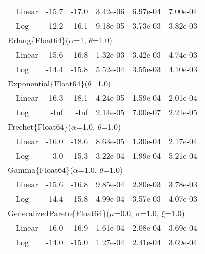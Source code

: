 \begin{tabular}{|llrrrrr|}
& Linear & {\color{blue}-15.7} & {\color{blue}-17.0} & {\color{blue}3.42e-06} & {\color{blue}6.97e-04} & {\color{blue}7.00e-04}\\
& Log & -12.2 & -16.1 & 9.18e-05 & 3.73e-03 & 3.82e-03\\
\hline
\multicolumn{7}{|l|}{Erlang\{Float64\}($\alpha$=1, $\theta$=1.0)}\\ \hline
& Linear & {\color{blue}-15.6} & {\color{blue}-16.8} & 1.32e-03 & {\color{blue}3.42e-03} & 4.74e-03\\
& Log & -14.4 & -15.8 & {\color{blue}5.52e-04} & 3.55e-03 & {\color{blue}4.10e-03}\\
\hline
\multicolumn{7}{|l|}{Exponential\{Float64\}($\theta$=1.0)}\\ \hline
& Linear & -16.3 & -18.1 & 4.24e-05 & 1.59e-04 & 2.01e-04\\
& Log & {\color{blue}-Inf} & {\color{blue}-Inf} & {\color{blue}2.14e-05} & {\color{blue}7.00e-07} & {\color{blue}2.21e-05}\\
\hline
\multicolumn{7}{|l|}{Frechet\{Float64\}($\alpha$=1.0, $\theta$=1.0)}\\ \hline
& Linear & {\color{blue}-16.0} & {\color{blue}-18.6} & {\color{blue}8.63e-05} & {\color{blue}1.30e-04} & {\color{blue}2.17e-04}\\
& Log & -3.0 & -15.3 & 3.22e-04 & 1.99e-04 & 5.21e-04\\
\hline
\multicolumn{7}{|l|}{Gamma\{Float64\}($\alpha$=1.0, $\theta$=1.0)}\\ \hline
& Linear & {\color{blue}-15.6} & {\color{blue}-16.8} & 9.85e-04 & {\color{blue}2.80e-03} & {\color{blue}3.78e-03}\\
& Log & -14.4 & -15.8 & {\color{blue}4.99e-04} & 3.57e-03 & 4.07e-03\\
\hline
\multicolumn{7}{|l|}{GeneralizedPareto\{Float64\}($\mu$=0.0, $\sigma$=1.0, $\xi$=1.0)}\\ \hline
& Linear & {\color{blue}-16.0} & {\color{blue}-16.9} & 1.61e-04 & {\color{blue}2.08e-04} & 3.69e-04\\
& Log & -14.0 & -15.0 & {\color{blue}1.27e-04} & 2.41e-04 & {\color{blue}3.69e-04}\\
\hline
\end{tabular}